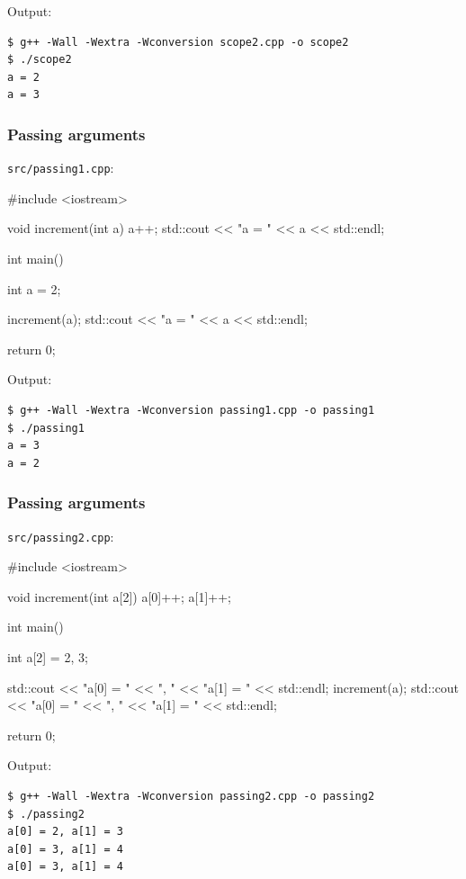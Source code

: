 \documentclass[12pt,letterpaper,twoside]{article}
\begin{document}
Output:

\begin{verbatim}
$ g++ -Wall -Wextra -Wconversion scope2.cpp -o scope2
$ ./scope2
a = 2
a = 3
\end{verbatim}

\subsubsection{Passing arguments}
\texttt{src/passing1.cpp}:

\begin{cpp}
#include <iostream>

void increment(int a) {
  a++;
  std::cout << "a = " << a << std::endl;
}

int main() {
  int a = 2;

  increment(a);
  std::cout << "a = " << a << std::endl;

  return 0;
}
\end{cpp}

Output:

\begin{verbatim}
$ g++ -Wall -Wextra -Wconversion passing1.cpp -o passing1
$ ./passing1
a = 3
a = 2
\end{verbatim}

\subsubsection{Passing arguments}
\texttt{src/passing2.cpp}:

\begin{cpp}
#include <iostream>

void increment(int a[2]) {
  a[0]++;
  a[1]++;
}

int main() {
  int a[2] = {2, 3};

  std::cout << "a[0] = " << ", " << "a[1] = " << std::endl;
  increment(a);
  std::cout << "a[0] = " << ", " << "a[1] = " << std::endl;
  
  return 0;
}
\end{cpp}

Output:

\begin{verbatim}
$ g++ -Wall -Wextra -Wconversion passing2.cpp -o passing2
$ ./passing2
a[0] = 2, a[1] = 3
a[0] = 3, a[1] = 4
a[0] = 3, a[1] = 4
\end{verbatim}
\end{document}
